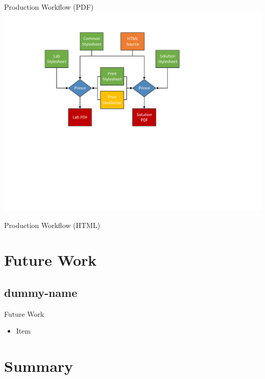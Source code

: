 \documentclass{beamer}
\begin{document}
	\begin{frame}{Production Workflow (PDF)}
		\includegraphics[width=\textwidth, clip=true, trim=1.3in 3in 3in 0.5in]{workflow.pdf}
	\end{frame}			

	\begin{frame}{Production Workflow (HTML)}
	\end{frame}	
		
	\section{Future Work}
	\subsection{dummy-name}
				
	\begin{frame}{Future Work}
		\begin{itemize}	
			\item Item
		\end{itemize}
	\end{frame}

	\section{Summary}
\end{document}
